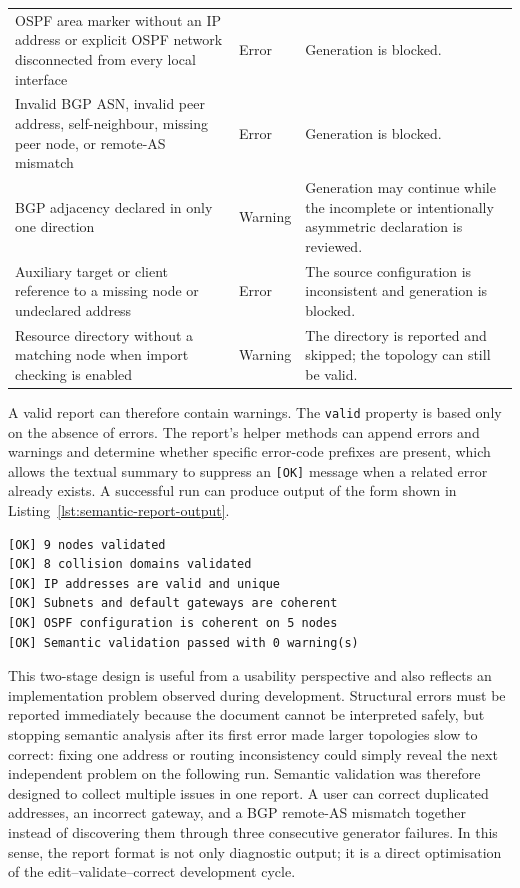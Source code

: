 {\begin{longtable}{>{\raggedright\arraybackslash}p{}>{\raggedright\arraybackslash}p{}>{\raggedright\arraybackslash}p{}}
OSPF area marker without an IP address or explicit OSPF network disconnected from every local interface & Error & Generation is blocked. \\
Invalid BGP ASN, invalid peer address, self-neighbour, missing peer node, or remote-AS mismatch & Error & Generation is blocked. \\
BGP adjacency declared in only one direction & Warning & Generation may continue while the incomplete or intentionally asymmetric declaration is reviewed. \\
Auxiliary target or client reference to a missing node or undeclared address & Error & The source configuration is inconsistent and generation is blocked. \\
Resource directory without a matching node when import checking is enabled & Warning & The directory is reported and skipped; the topology can still be valid. \\
\bottomrule
\end{longtable}
}

A valid report can therefore contain warnings. The \texttt{valid} property is
based only on the absence of errors. The report's helper methods can append
errors and warnings and determine whether specific error-code prefixes are
present, which allows the textual summary to suppress an \texttt{[OK]} message
when a related error already exists. A successful run can produce output of
the form shown in Listing~\ref{lst:semantic-report-output}.

\begin{lstlisting}[caption={Example of a successful semantic validation report.},label={lst:semantic-report-output}]
[OK] 9 nodes validated
[OK] 8 collision domains validated
[OK] IP addresses are valid and unique
[OK] Subnets and default gateways are coherent
[OK] OSPF configuration is coherent on 5 nodes
[OK] Semantic validation passed with 0 warning(s)
\end{lstlisting}

This two-stage design is useful from a usability perspective and also reflects
an implementation problem observed during development. Structural errors must
be reported immediately because the document cannot be interpreted safely, but
stopping semantic analysis after its first error made larger topologies slow to
correct: fixing one address or routing inconsistency could simply reveal the
next independent problem on the following run. Semantic validation was
therefore designed to collect multiple issues in one report. A user can correct
duplicated addresses, an incorrect gateway, and a BGP remote-AS mismatch
together instead of discovering them through three consecutive generator
failures. In this sense, the report format is not only diagnostic output; it is
a direct optimisation of the edit--validate--correct development cycle.

